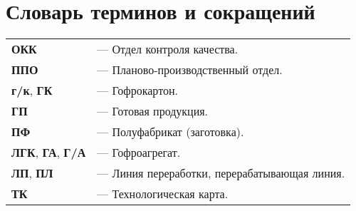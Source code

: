 
\def \notincludehead{}






 	\maketitle

% 	

	\scriptsize
	\setcounter{tocdepth}{4}
	\tableofcontents
	\normalsize
	\newpage

 	
 	
 	 	
 	
 	\newpage
 	
 	
 \section*{Словарь терминов и сокращений}
\noindent

\begin{tabular}{l l}
{\bf ОКК}  & --- Отдел контроля качества.\\
{\bf ППО}  & --- Планово-производственный отдел.\\
{\bf г/к}, {\bf ГК}  & --- Гофрокартон.\\
{\bf ГП}  & --- Готовая продукция.\\
{\bf ПФ}  & --- Полуфабрикат (заготовка).\\
{\bf ЛГК}, {\bf ГА}, {\bf Г/А}  & --- Гофроагрегат.\\
{\bf ЛП}, {\bf ПЛ}  & --- Линия переработки, перерабатывающая линия.\\
{\bf ТК}  & --- Технологическая карта.\\
	
\end{tabular}






\newcommand*{\IsScancode}{0}  %
\newcommand*{\IsOKP}{0}  %




\newpage




